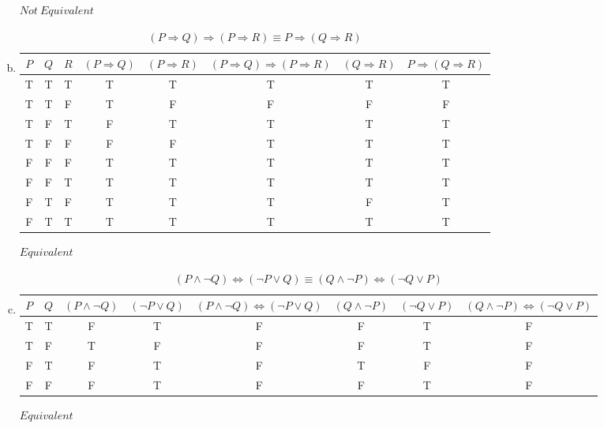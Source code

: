 \documentclass[11pt,letterpaper]{article}
\begin{document}
\begin{enumerate}[(a)]
$Not~Equivalent$
\clearpage
\item 
\begin{table}[h] 
\caption{$(P\Rightarrow Q)\Rightarrow (P\Rightarrow R) \equiv P\Rightarrow (Q\Rightarrow R)$} %
\centering %
\begin{tabular}{c c c c c c c c} %
\hline %
$P$ & $Q$ & $R$ \vline & $(P\Rightarrow Q)$ \vline & $(P\Rightarrow R)$ \vline & $(P\Rightarrow Q)\Rightarrow (P\Rightarrow R)$ \vline & $(Q\Rightarrow R)$ \vline & $P\Rightarrow (Q\Rightarrow R)$\\ %
\hline %
T & T & T & T & T & T & T & T\\
T & T & F & T & F & F & F & F\\
T & F & T & F & T & T & T & T\\
T & F & F & F & F & T & T & T\\
F & F & F & T & T & T & T & T\\
F & F & T & T & T & T & T & T\\
F & T & F & T & T & T & F & T\\
F & T & T & T & T & T & T & T\\
\hline %
\end{tabular} 
\label{table:1a} %
\end{table}
$Equivalent$

\item

\begin{table}[h] 
\caption{$(P\wedge\neg Q)\Leftrightarrow (\neg P\vee Q)\equiv (Q\wedge \neg P)\Leftrightarrow (\neg Q \vee P)$} %
\centering %
\begin{tabular}{c c c c c c c c} %
\hline %
$P$ & $Q$ \vline & $(P\wedge\neg Q)$ \vline & $(\neg P\vee Q)$ \vline & $(P\wedge\neg Q)\Leftrightarrow (\neg P\vee Q)$ \vline & $(Q\wedge \neg P)$ \vline & $(\neg Q \vee P)$ \vline & $(Q\wedge \neg P)\Leftrightarrow (\neg Q \vee P)$\\ %
\hline %
T & T & F & T & F & F & T & F \\
T & F & T & F & F & F & T & F \\
F & T & F & T & F & T & F & F \\
F & F & F & T & F & F & T & F \\

\hline %
\end{tabular} 
\label{table:1a} %
\end{table}
$Equivalent$

\end{enumerate}
\end{document}
